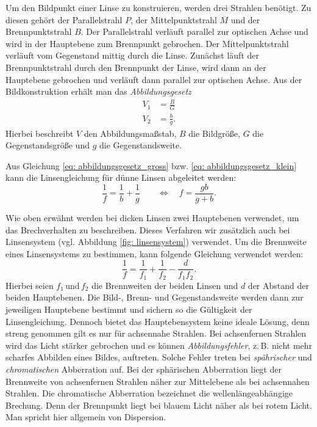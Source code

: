 Um den Bildpunkt einer Linse zu konstruieren, werden drei Strahlen benötigt.
Zu diesen gehört der Parallelstrahl $P$, der Mittelpunktstrahl $M$ und der
Brennpunktstrahl $B$.
Der Parallelstrahl verläuft parallel zur optischen Achse und wird in der Hauptebene
zum Brennpunkt gebrochen. Der Mittelpunktstrahl verläuft vom Gegenstand mittig durch die
Linse. Zunächst läuft der Brennpunktstrahl durch den Brennpunkt der Linse, wird dann
an der Hauptebene gebrochen und verläuft dann parallel zur optischen Achse.
Aus der Bildkonstruktion erhält man das \emph{Abbildungsgesetz} %
\begin{align}
  V_1&=\frac{B}{G} \label{eq: abbildungsgesetz_gross} \\
  V_2&=\frac{b}{g} \label{eq: abbildungsgesetz_klein}.
\end{align}
Hierbei beschreibt $V$ den Abbildungsmaßstab, $B$ die Bildgröße, $G$ die Gegenstandsgröße
und $g$ die Gegenstandsweite. %

Aus Gleichung \eqref{eq: abbildungsgesetz_gross} bzw. \eqref{eq: abbildungsgesetz_klein}
kann die Linsengleichung für dünne Linsen abgeleitet werden:
\begin{equation}
  \label{eq: linsengleichung}
  \frac{1}{f}= \frac{1}{b}+  \frac{1}{g} \qquad \Leftrightarrow \quad f= \frac{gb}{g+b}.
\end{equation}

Wie oben erwähnt werden bei dicken Linsen zwei Hauptebenen verwendet, um das Brechverhalten
zu beschreiben. Dieses Verfahren wir zusätzlich auch bei Linsensystem (vgl. Abbildung \ref{fig: linsensystem}) verwendet. %
Um die Brennweite eines Linsensystems zu bestimmen, kann folgende Gleichung verwendet werden:
\begin{equation}
  \label{eq: gleichung_linsensystem}
  \frac{1}{f}=\frac{1}{f_1}+\frac{1}{f_2}-\frac{d}{f_1f_2}.
\end{equation}
Hierbei seien $f_1 \, \text{und} \, f_2$ die Brennweiten der beiden Linsen und $d$ der
Abstand der beiden Hauptebenen.
Die Bild-, Brenn- und Gegenstandsweite werden dann zur jeweiligen Hauptebene
bestimmt und sichern so die Gültigkeit der Linsengleichung.
Dennoch bietet das Hauptebensystem keine ideale Lösung, denn streng genommen
gilt es nur für achsennahe Strahlen. Bei achsenfernen Strahlen wird das Licht stärker
gebrochen und es können \emph{Abbildungsfehler}, z.\,B. nicht mehr scharfes Abbilden eines Bildes,
auftreten. Solche Fehler treten bei \emph{spährischer} und \emph{chromatischen} Abberration auf.
Bei der sphärischen Abberration liegt der Brennweite von achsenfernen Strahlen näher zur
Mittelebene als bei achsennahen Strahlen. Die chromatische Abberration bezeichnet die
wellenlängeabhängige Brechung. Denn der Brennpunkt liegt bei blauem Licht näher als %
bei rotem Licht. Man spricht hier allgemein von Dispersion. %

